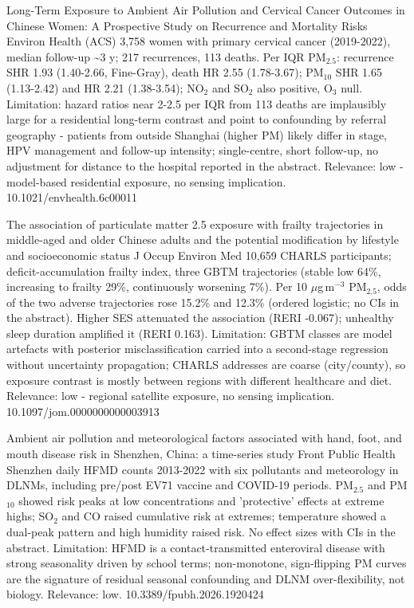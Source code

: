 \documentclass[10pt]{article}
\begin{document}
{Long-Term Exposure to Ambient Air Pollution and Cervical Cancer Outcomes in Chinese Women: A Prospective Study on Recurrence and Mortality Risks}
{Environ Health (ACS)}
{3,758 women with primary cervical cancer (2019-2022), median follow-up \textasciitilde{}3 y; 217 recurrences, 113 deaths. Per IQR PM$_{2.5}$: recurrence SHR 1.93 (1.40-2.66, Fine-Gray), death HR 2.55 (1.78-3.67); PM$_{10}$ SHR 1.65 (1.13-2.42) and HR 2.21 (1.38-3.54); NO$_2$ and SO$_2$ also positive, O$_3$ null. Limitation: hazard ratios near 2-2.5 per IQR from 113 deaths are implausibly large for a residential long-term contrast and point to confounding by referral geography - patients from outside Shanghai (higher PM) likely differ in stage, HPV management and follow-up intensity; single-centre, short follow-up, no adjustment for distance to the hospital reported in the abstract. Relevance: low - model-based residential exposure, no sensing implication.}
{10.1021/envhealth.6c00011}

{The association of particulate matter 2.5 exposure with frailty trajectories in middle-aged and older Chinese adults and the potential modification by lifestyle and socioeconomic status}
{J Occup Environ Med}
{10,659 CHARLS participants; deficit-accumulation frailty index, three GBTM trajectories (stable low 64\%, increasing to frailty 29\%, continuously worsening 7\%). Per 10 $\mu$g\,m$^{-3}$ PM$_{2.5}$, odds of the two adverse trajectories rose 15.2\% and 12.3\% (ordered logistic; no CIs in the abstract). Higher SES attenuated the association (RERI -0.067); unhealthy sleep duration amplified it (RERI 0.163). Limitation: GBTM classes are model artefacts with posterior misclassification carried into a second-stage regression without uncertainty propagation; CHARLS addresses are coarse (city/county), so exposure contrast is mostly between regions with different healthcare and diet. Relevance: low - regional satellite exposure, no sensing implication.}
{10.1097/jom.0000000000003913}

{Ambient air pollution and meteorological factors associated with hand, foot, and mouth disease risk in Shenzhen, China: a time-series study}
{Front Public Health}
{Shenzhen daily HFMD counts 2013-2022 with six pollutants and meteorology in DLNMs, including pre/post EV71 vaccine and COVID-19 periods. PM$_{2.5}$ and PM$_{10}$ showed risk peaks at low concentrations and 'protective' effects at extreme highs; SO$_2$ and CO raised cumulative risk at extremes; temperature showed a dual-peak pattern and high humidity raised risk. No effect sizes with CIs in the abstract. Limitation: HFMD is a contact-transmitted enteroviral disease with strong seasonality driven by school terms; non-monotone, sign-flipping PM curves are the signature of residual seasonal confounding and DLNM over-flexibility, not biology. Relevance: low.}
{10.3389/fpubh.2026.1920424}
\end{document}

